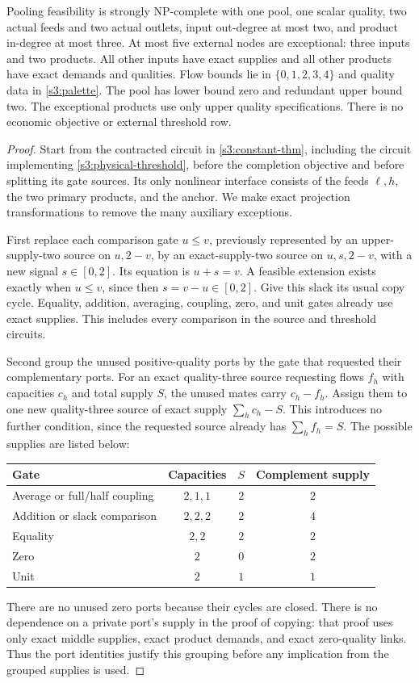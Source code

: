 \begin{theorem}\label{s3:five-thm}
Pooling feasibility is strongly NP-complete with one pool, one scalar
quality, two actual feeds and two actual outlets, input out-degree at
most two, and product in-degree at most three. At most five external
nodes are exceptional: three inputs and two products. All other inputs
have exact supplies and all other products have exact demands and
qualities. Flow bounds lie in $\{0,1,2,3,4\}$ and quality data in
\eqref{s3:palette}. The pool has lower bound zero and redundant upper
bound two. The exceptional products use only upper quality specifications.
There is no economic objective or external threshold row.
\end{theorem}
\begin{proof}
Start from the contracted circuit in \cref{s3:constant-thm}, including
the circuit implementing \eqref{s3:physical-threshold}, before the
completion objective and before splitting its gate sources. Its only
nonlinear interface consists of the feeds $\ell,h$, the two primary
products, and the anchor. We make exact projection transformations to
remove the many auxiliary exceptions.

First replace each comparison gate $u\le v$, previously represented by
an upper-supply-two source on $u,2-v$, by an exact-supply-two source on
$u,s,2-v$, with a new signal $s\in[0,2]$. Its equation is $u+s=v$.
A feasible extension exists exactly when $u\le v$, since then
$s=v-u\in[0,2]$. Give this slack its usual copy cycle. Equality,
addition, averaging, coupling, zero, and unit gates already use exact
supplies. This includes every comparison in the source and threshold
circuits.

Second group the unused positive-quality ports by the gate that requested
their complementary ports. For an exact quality-three source requesting
flows $f_h$ with capacities $c_h$ and total supply $S$, the unused mates
carry $c_h-f_h$. Assign them to one new quality-three source of exact
supply $\sum_hc_h-S$. This introduces no further condition, since the
requested source already has $\sum_hf_h=S$. The possible supplies are
listed below:
\begin{center}
\begin{tabular}{lccc}
\toprule
Gate & Capacities & $S$ & Complement supply\\
\midrule
Average or full/half coupling & $2,1,1$ & $2$ & $2$\\
Addition or slack comparison & $2,2,2$ & $2$ & $4$\\
Equality & $2,2$ & $2$ & $2$\\
Zero & $2$ & $0$ & $2$\\
Unit & $2$ & $1$ & $1$\\
\bottomrule
\end{tabular}
\end{center}
There are no unused zero ports because their cycles are closed. There
is no dependence on a private port's supply in the proof of copying:
that proof uses only exact middle supplies, exact product demands, and
exact zero-quality links. Thus the port identities justify this grouping
before any implication from the grouped supplies is used.


\end{proof}
